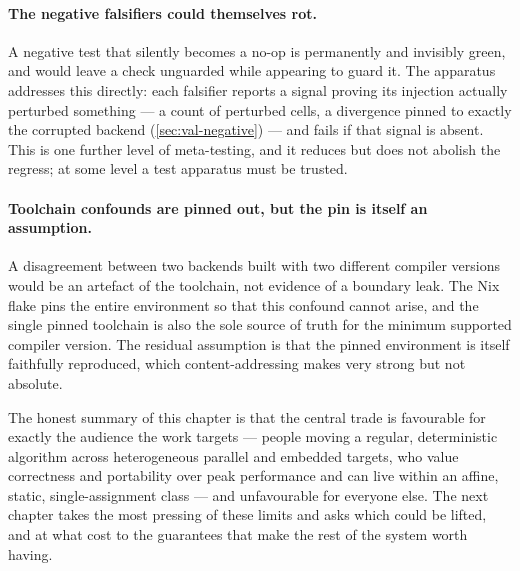 \paragraph{The negative falsifiers could themselves rot.} A negative test that
silently becomes a no-op is permanently and invisibly green, and would leave a check
unguarded while appearing to guard it. The apparatus addresses this directly: each
falsifier reports a signal proving its injection actually perturbed something --- a
count of perturbed cells, a divergence pinned to exactly the corrupted backend
(\cref{sec:val-negative}) --- and fails if that signal is absent. This is one further level of meta-testing, and it reduces but
does not abolish the regress; at some level a test apparatus must be trusted.

\paragraph{Toolchain confounds are pinned out, but the pin is itself an
assumption.} A disagreement between two backends built with two different compiler
versions would be an artefact of the toolchain, not evidence of a boundary leak. The
Nix flake pins the entire environment so that this confound cannot arise, and the
single pinned toolchain is also the sole source of truth for the minimum supported
compiler version. The residual assumption is that the pinned environment is itself
faithfully reproduced, which content-addressing makes very strong but not absolute.

The honest summary of this chapter is that the central trade is favourable for
exactly the audience the work targets --- people moving a regular, deterministic
algorithm across heterogeneous parallel and embedded targets, who value
correctness and portability over peak performance and can live within an affine,
static, single-assignment class --- and unfavourable for everyone else. The next
chapter takes the most pressing of these limits and asks which could be lifted, and
at what cost to the guarantees that make the rest of the system worth having.
